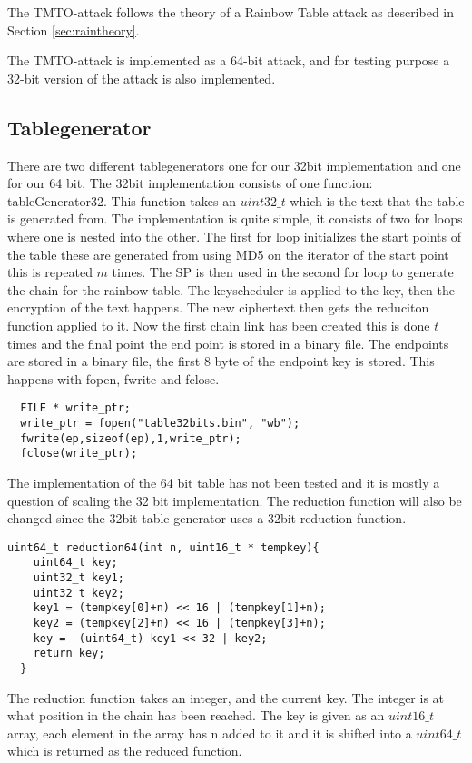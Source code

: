 The TMTO-attack follows the theory of a Rainbow Table attack as
described in Section \ref{sec:raintheory}.

The TMTO-attack is implemented as a 64-bit attack, and for testing
purpose a 32-bit version of the attack is also implemented.

\subsection{Tablegenerator}
There are two different tablegenerators one for our 32bit implementation and one for our 64 bit.
The 32bit implementation consists of one function: tableGenerator32. This function takes an $uint32\_t$ which is the text that the table is generated from. The implementation is quite simple, it consists of two for loops where one is nested into the other. The first for loop initializes the start points of the table these are generated from using MD5 on the iterator of the start point this is repeated $m$ times.
The SP is then used in the second for loop to generate the chain for the rainbow table.
The keyscheduler is applied to the key, then the encryption of the text happens. The new ciphertext then gets the reduciton function applied to it. Now the first chain link has been created this is done $t$ times and the final point the end point is stored in a binary file.
The endpoints are stored in a binary file, the first 8 byte of the endpoint key is stored. This happens with fopen, fwrite and fclose.
\lstset{language=C}
\begin{lstlisting}
  FILE * write_ptr;
  write_ptr = fopen("table32bits.bin", "wb");
  fwrite(ep,sizeof(ep),1,write_ptr);
  fclose(write_ptr);
\end{lstlisting}
The implementation of the 64 bit table has not been tested and it is mostly a question of scaling the 32 bit implementation. The reduction function will also be changed since the 32bit table generator uses a 32bit reduction function.
\begin{lstlisting}
uint64_t reduction64(int n, uint16_t * tempkey){
    uint64_t key;
    uint32_t key1;
    uint32_t key2;
    key1 = (tempkey[0]+n) << 16 | (tempkey[1]+n);
    key2 = (tempkey[2]+n) << 16 | (tempkey[3]+n);
    key =  (uint64_t) key1 << 32 | key2;
    return key;
  }
\end{lstlisting}

The reduction function takes an integer, and the current key. The integer is at what position in the chain has been reached. The key is given as an $uint16\_t$ array, each element in the array has n added to it and it is shifted into a $uint64\_t$ which is returned as the reduced function.

